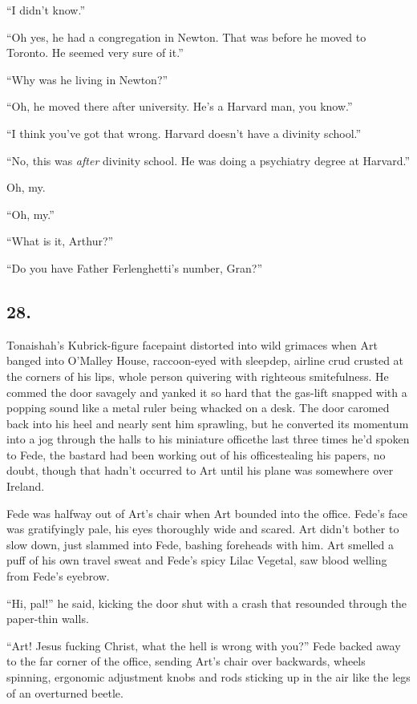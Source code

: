 “I didn’t know.”

“Oh yes, he had a congregation in Newton. That was before he moved
to Toronto. He seemed very sure of it.”

“Why was he living in Newton?”

“Oh, he moved there after university. He’s a Harvard man, you
know.”

“I think you’ve got that wrong. Harvard doesn’t have a divinity
school.”

“No, this was \emph{after} divinity school. He was doing a
psychiatry degree at Harvard.”

Oh, my.

“Oh, my.”

“What is it, Arthur?”

“Do you have Father Ferlenghetti’s number, Gran?”

\subsection{28.}

Tonaishah’s Kubrick-figure facepaint distorted into wild grimaces
when Art banged into O’Malley House, raccoon-eyed with sleepdep,
airline crud crusted at the corners of his lips, whole person
quivering with righteous smitefulness. He commed the door savagely
and yanked it so hard that the gas-lift snapped with a popping
sound like a metal ruler being whacked on a desk. The door caromed
back into his heel and nearly sent him sprawling, but he converted
its momentum into a jog through the halls to his miniature
office{\dash}the last three times he’d spoken to Fede, the bastard had
been working out of his office{\dash}stealing his papers, no doubt,
though that hadn’t occurred to Art until his plane was somewhere
over Ireland.

Fede was halfway out of Art’s chair when Art bounded into the
office. Fede’s face was gratifyingly pale, his eyes thoroughly wide
and scared. Art didn’t bother to slow down, just slammed into Fede,
bashing foreheads with him. Art smelled a puff of his own travel
sweat and Fede’s spicy Lilac Vegetal, saw blood welling from Fede’s
eyebrow.

“Hi, pal!” he said, kicking the door shut with a crash that
resounded through the paper-thin walls.

“Art! Jesus fucking Christ, what the hell is wrong with you?” Fede
backed away to the far corner of the office, sending Art’s chair
over backwards, wheels spinning, ergonomic adjustment knobs and
rods sticking up in the air like the legs of an overturned beetle.

